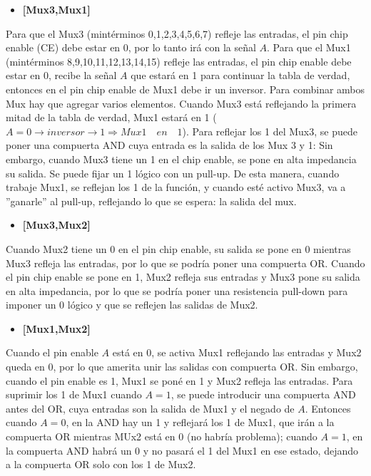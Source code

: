 \begin{itemize}[nosep] \item\textbf{[Mux3,Mux1]}\end{itemize}
\sangria{} Para que el Mux3 (mintérminos 0,1,2,3,4,5,6,7) refleje las entradas, el pin chip enable (CE) debe estar en 0, por lo tanto irá con la señal $A$.
\sangria{} Para que el Mux1 (mintérminos 8,9,10,11,12,13,14,15) refleje las entradas, el pin chip enable debe estar en 0, recibe la señal $A$ que estará en 1 para continuar la tabla de verdad, entonces en el pin chip enable de Mux1 debe ir un inversor.
\sangria{} Para combinar ambos Mux hay que agregar varios elementos. Cuando Mux3 está reflejando la primera mitad de la tabla de verdad, Mux1 estará en 1 ($A = 0 \rightarrow inversor \rightarrow 1 \Rightarrow Mux1\quad{}en\quad{}1$). Para reflejar los 1 del Mux3, se puede poner una compuerta AND cuya entrada es la salida de los Mux 3 y 1:
\sangria{} Sin embargo, cuando Mux3 tiene un 1 en el chip enable, se pone en alta impedancia su salida. Se puede fijar un 1 lógico con un pull-up. De esta manera, cuando trabaje Mux1, se reflejan los 1 de la función, y cuando esté activo Mux3, va a ''ganarle'' al pull-up, reflejando lo que se espera: la salida del mux.
\begin{itemize}[nosep] \item\textbf{[Mux3,Mux2]}\end{itemize}
\sangria{} Cuando Mux2 tiene un 0 en el pin chip enable, su salida se pone en 0 mientras Mux3 refleja las entradas, por lo que se podría poner una compuerta OR. Cuando el pin chip enable se pone en 1, Mux2 refleja sus entradas y Mux3 pone su salida en alta impedancia, por lo que se podría poner una resistencia pull-down para imponer un 0 lógico y que se reflejen las salidas de Mux2.
\begin{itemize}[nosep] \item\textbf{[Mux1,Mux2]}\end{itemize}
\sangria{} Cuando el pin enable $A$ está en 0, se activa Mux1 reflejando las entradas y Mux2 queda en 0, por lo que amerita unir las salidas con compuerta OR. Sin embargo, cuando el pin enable es 1, Mux1 se poné en 1 y Mux2 refleja las entradas. Para suprimir los 1 de Mux1 cuando $A=1$, se puede introducir una compuerta AND antes del OR, cuya entradas son la salida de Mux1 y el negado de $A$. Entonces cuando $A=0$, en la AND hay un 1 y reflejará los 1 de Mux1, que irán a la compuerta OR mientras MUx2 está en 0 (no habría problema); cuando $A=1$, en la compuerta AND habrá un 0 y no pasará el 1 del Mux1 en ese estado, dejando a la compuerta OR solo con los 1 de Mux2.
